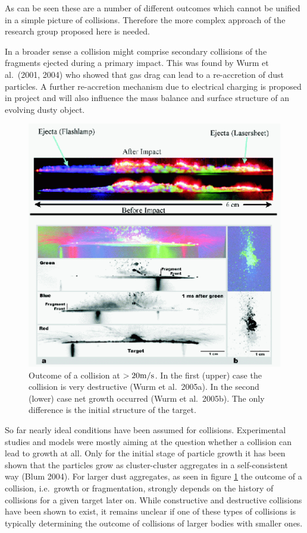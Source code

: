 As can be seen these are a number of different outcomes which cannot be
unified in a simple picture of collisions. Therefore the more complex
approach of the research group proposed here is needed.

In a broader sense a collision might comprise secondary collisions of the
fragments ejected during a primary impact. This was found by Wurm et
al.~(2001, 2004) who showed that gas drag can lead to a re-accretion of dust
particles. A further re-accretion mechanism due to electrical charging is
proposed in project \projblum{} and will also influence the mass balance and
surface structure of an evolving dusty object.

\begin{figure}
\centerline{\includegraphics[width=15cm]{b2fig2.eps}}
\caption{\label{soorso}Outcome of a collision at $\rm >20m/s$. 
In the first (upper) case the collision is very destructive (Wurm et
al.~2005a). In the second (lower) case net growth occurred (Wurm et
al.~2005b).  The only difference is the initial structure of the target.}
\end{figure}


So far nearly ideal conditions have been assumed for
collisions. Experimental studies and models were mostly aiming at the
question whether a collision can lead to growth at all. Only for the
initial stage of particle growth it has been shown that the particles grow
as cluster-cluster aggregates in a self-consistent way (Blum 2004). For
larger dust aggregates, as seen in figure \ref{soorso} the outcome of a
collision, i.e.\ growth or fragmentation, strongly depends on the history of
collisions for a given target later on. While constructive and destructive
collisions have been shown to exist, it remains unclear if one of these
types of collisions is typically determining the outcome of collisions of
larger bodies with smaller ones.




